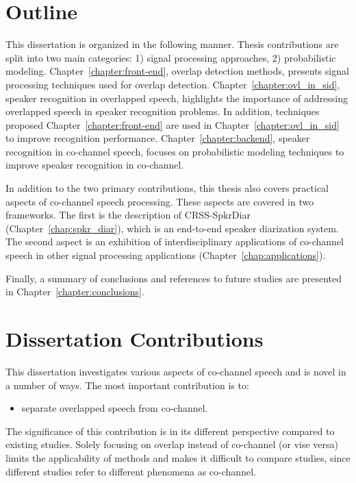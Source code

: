 \section{Outline}
\label{sec:intro_outline}
This dissertation is organized in the following manner. 
Thesis contributions are split into two main categories: 1) signal processing approaches, 2) probabilistic modeling. 
Chapter~\ref{chapter:front-end}, overlap detection methods, presents signal processing techniques used for overlap detection. 
Chapter~\ref{chapter:ovl_in_sid}, speaker recognition in overlapped speech, highlights the importance of addressing overlapped speech in speaker recognition problems. 
In addition, techniques proposed Chapter~\ref{chapter:front-end} are used in Chapter~\ref{chapter:ovl_in_sid} to improve recognition performance. 
Chapter~\ref{chapter:backend}, speaker recognition in co-channel speech, focuses on probabilistic modeling techniques to improve speaker recognition in co-channel. 

In addition to the two primary contributions, this thesis also covers practical aspects of co-channel speech processing. 
These aspects are covered in two frameworks. 
The first is the description of CRSS-SpkrDiar (Chapter~\ref{chap:spkr_diar}), which is an end-to-end speaker diarization system. 
The second aspect is an exhibition of interdisciplinary applications of co-channel speech  in other signal processing applications (Chapter~\ref{chap:applications}). 

Finally, a summary of conclusions and references to future studies are presented in Chapter~\ref{chapter:conclusions}. 

\section{Dissertation Contributions}
\label{sec:contributions}
This dissertation investigates various aspects of co-channel speech and is novel in a number of ways. 
The most important contribution is to:
\begin{itemize}
	\item separate overlapped speech from co-channel.
\end{itemize}
The significance of this contribution is in its different perspective compared to existing studies. 
Solely focusing on overlap instead of co-channel (or vise versa) limits the applicability of methods and makes it difficult to compare studies, since different studies refer to different phenomena as co-channel. 

